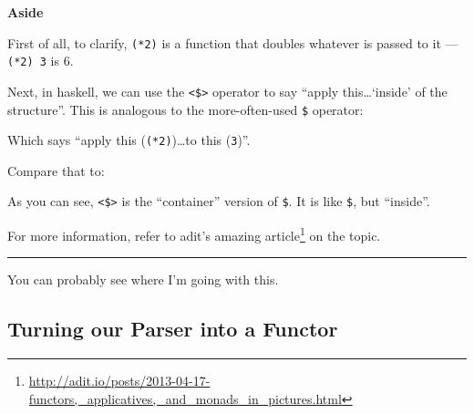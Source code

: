 \documentclass[]{article}
\newenvironment{Shaded}{}{}
\newcommand{\DataTypeTok}[1]{\textcolor[rgb]{0.56,0.13,0.00}{#1}}
\newcommand{\DecValTok}[1]{\textcolor[rgb]{0.25,0.63,0.44}{#1}}
\newcommand{\NormalTok}[1]{#1}
\newcommand{\OperatorTok}[1]{\textcolor[rgb]{0.40,0.40,0.40}{#1}}
\renewcommand{\href}[2]{#2\footnote{\url{#1}}}
\begin{document}
\textbf{Aside}

First of all, to clarify, \texttt{(*2)} is a function that doubles whatever is
passed to it --- \texttt{(*2)\ 3} is 6.

Next, in haskell, we can use the \texttt{\textless{}\$\textgreater{}} operator
to say ``apply this\ldots{}`inside' of the structure''. This is analogous to the
more-often-used \texttt{\$} operator:

\begin{Shaded}
\end{Shaded}

Which says ``apply this (\texttt{(*2)})\ldots to this (\texttt{3})''.

Compare that to:

\begin{Shaded}
\end{Shaded}

As you can see, \texttt{\textless{}\$\textgreater{}} is the ``container''
version of \texttt{\$}. It is like \texttt{\$}, but ``inside''.

For more information, refer to adit's
\href{http://adit.io/posts/2013-04-17-functors,_applicatives,_and_monads_in_pictures.html}{amazing
article} on the topic.

\begin{center}\rule{0.5\linewidth}{\linethickness}\end{center}

You can probably see where I'm going with this.

\hypertarget{turning-our-parser-into-a-functor}{%
\subsection{Turning our Parser into a
Functor}\label{turning-our-parser-into-a-functor}}
\end{document}
